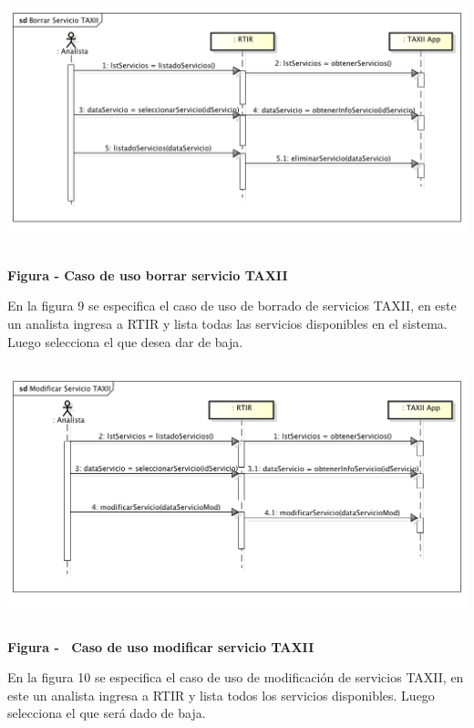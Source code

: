 \bigskip
\begin{center}
	\includegraphics[width=5.7634in,height=2.898in]{Analisis22-img/Analisis22-img024.png} 
	{\centering{}\bfseries
		\foreignlanguage{spanish}{Figura }\foreignlanguage{spanish}{ - Caso de uso borrar
			servicio TAXII}
		\par}
\end{center}
{
	En la figura 9 se especifica el caso de uso de borrado de servicios TAXII, en este un analista ingresa a RTIR y lista
	todas las servicios disponibles en el sistema. Luego selecciona el que desea dar de baja.}
\newpage
\begin{center}
	\includegraphics[width=5.7638in,height=2.9366in]{Analisis22-img/Analisis22-img025.png} 
	{\centering{}\bfseries
		\foreignlanguage{spanish}{Figura }\foreignlanguage{spanish}{ - \ Caso de uso modificar
			servicio TAXII}
		\par}
\end{center}

{
	En la figura 10 se especifica el caso de uso de modificación de servicios TAXII, en este un analista ingresa a RTIR y
	lista todos los servicios disponibles. Luego selecciona el que será dado de baja.}
\newpage

